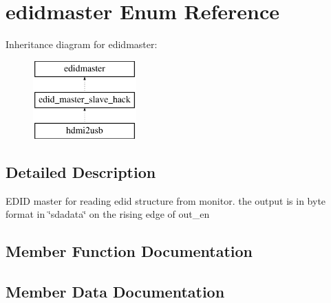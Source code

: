 \section{edidmaster Enum Reference}
\label{enum1edidmaster}
Inheritance diagram for edidmaster\-:\begin{figure}[H]
\begin{center}
\leavevmode
\includegraphics[height=3.000000cm]{enum1edidmaster}
\end{center}
\end{figure}


\subsection{Detailed Description}
E\-D\-I\-D master for reading edid structure from monitor. the output is in byte format in \char`\"{}sdadata\char`\"{} on the rising edge of out\-\_\-en 

\subsection{Member Function Documentation}
\subsubsection[{P\-R\-O\-C\-E\-S\-S\-\_\-14}]{\setlength{\rightskip}{0pt plus 5cm}\hspace{0.3cm}}\label{enum1edidmaster_a7bc9a0c64529b658f4ba141aaa234427}


\subsection{Member Data Documentation}
\subsubsection[{clk}]{ {\bfseries \textcolor{vhdlchar}{ }} \hspace{0.3cm}}\label{enum1edidmaster_a685caa649809a3fb801e0a8090e11827}
